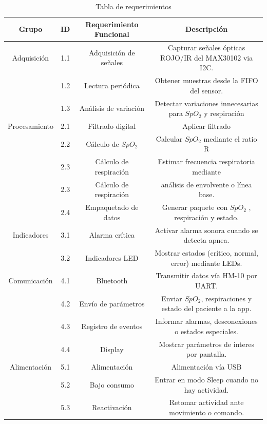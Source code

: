 \begin{table}[h]
    \centering
    \hspace*{-.8cm}
    \begin{tabular}{|c|c|c|c|}
        \hline
        Grupo & ID & Requerimiento Funcional & Descripción \\ 
        \hline
        Adquisición& 1.1 & Adquisición de señales & Capturar señales ópticas ROJO/IR del MAX30102 via I2C.\\ \hline
         & 1.2 &Lectura periódica& Obtener muestras desde la FIFO del sensor.\\ \hline 
         &1.3 & Análisis de variación& Detectar variaciones innecesarias para $SpO_{2}$ y respiración \\ \hline
        Procesamiento& 2.1 & Filtrado digital& Aplicar filtrado \\ \hline
        & 2.2 &Cálculo de $SpO_{2}$ & Calcular $SpO_{2}$ mediante el ratio R\\ \hline
        & 2.3 & Cálculo de respiración & Estimar frecuencia respiratoria mediante\\ \hline
        & 2.3 & Cálculo de respiración & análisis de envolvente o línea base. \\ \hline
         & 2.4 & Empaquetado de datos & Generar paquete con $SpO_{2}$ , respiración y estado. \\ \hline
        Indicadores& 3.1 & Alarma crítica & Activar alarma sonora cuando se detecta apnea. \\ \hline
         & 3.2 & Indicadores LED & Mostrar estados (crítico, normal, error) mediante LEDs. \\ \hline
        Comunicación & 4.1 & Bluetooth & Transmitir datos vía HM-10 por UART. \\ \hline
        & 4.2 & Envío de parámetros & Enviar $SpO_{2}$, respiraciones y estado del paciente a la app. \\ \hline
         & 4.3 & Registro de eventos & Informar alarmas, desconexiones o estados especiales. \\ \hline
        & 4.4 & Display & Mostrar parámetros de interes por pantalla.\\ \hline
        Alimentación& 5.1 & Alimentación & Alimentación vía USB \\ \hline
         & 5.2 & Bajo consumo & Entrar en modo Sleep cuando no hay actividad. \\ \hline
        & 5.3 & Reactivación & Retomar actividad ante movimiento o comando. \\ \hline
    \end{tabular}
    \caption{Tabla de requerimientos}
    \label{tab:tab_requerimientos}
\end{table}

